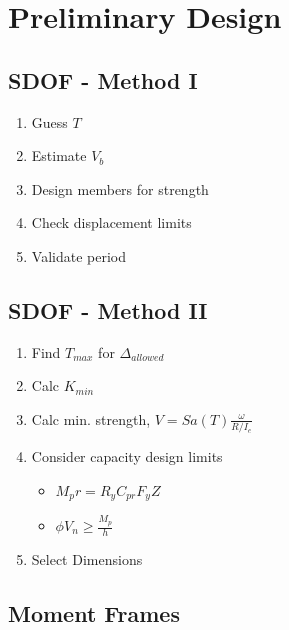 \hypertarget{preliminary-design}{%
\section{Preliminary Design}\label{preliminary-design}}

\hypertarget{sdof---method-i}{%
\subsection{SDOF - Method I}\label{sdof---method-i}}

\begin{enumerate}
\def\labelenumi{\arabic{enumi}.}
\tightlist
\item
  Guess \(T\)
\item
  Estimate \(V_b\)
\item
  Design members for strength
\item
  Check displacement limits
\item
  Validate period
\end{enumerate}

\hypertarget{sdof---method-ii}{%
\subsection{SDOF - Method II}\label{sdof---method-ii}}

\begin{enumerate}
\def\labelenumi{\arabic{enumi}.}
\tightlist
\item
  Find \(T_{max}\) for \(\Delta_{allowed}\)
\item
  Calc \(K_{min}\)
\item
  Calc min. strength, \(V = Sa(T)\frac{\omega}{R/I_e}\)
\item
  Consider capacity design limits

  \begin{itemize}
  \tightlist
  \item
    \(M_pr =R_y C_{pr} F_y Z\)
  \item
    \(\phi V_n \ge \frac{M_p}{h}\)
  \end{itemize}
\item
  Select Dimensions
\end{enumerate}

\hypertarget{moment-frames}{%
\subsection{Moment Frames}\label{moment-frames}}

